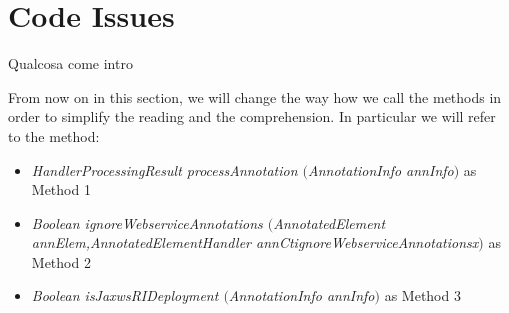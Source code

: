 \section{Code Issues}

Qualcosa come intro

From now on in this section, we will change the way how we call the methods in order to simplify the reading and the comprehension. \newline
In particular we will refer to the method:
\begin{itemize}
	\item \textit{HandlerProcessingResult processAnnotation $($AnnotationInfo annInfo$)$} as Method 1
	\item \textit{Boolean ignoreWebserviceAnnotations $($AnnotatedElement annElem,AnnotatedElementHandler annCtignoreWebserviceAnnotationsx$)$} as Method 2 
	\item \textit{Boolean isJaxwsRIDeployment $($AnnotationInfo annInfo$)$} as Method 3
\end{itemize}
